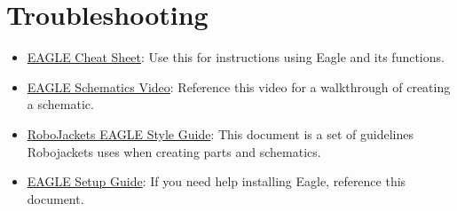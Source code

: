 \documentclass{article}
\begin{document}
\section{Troubleshooting}
\begin{itemize}
    \item \href{https://github.com/RoboJackets/electrical-training/blob/master/references/eagle_cheat_sheet/eagle_cheat_sheet.pdf}{EAGLE Cheat Sheet}: Use this for instructions using Eagle and its functions.
    \item \href{https://www.youtube.com/watch?v=gEWAhHHDmQk}{EAGLE Schematics Video}: Reference this video for a walkthrough of creating a schematic.
    \item \href{https://wiki.robojackets.org/EAGLE_Style_Guide}{RoboJackets EAGLE Style Guide}: This document is a set of guidelines Robojackets uses when creating parts and schematics.
    \item \href{https://github.com/RoboJackets/eagle-libraries} {EAGLE Setup Guide}: If you need help installing Eagle, reference this document.
\end{itemize}
\end{document}
